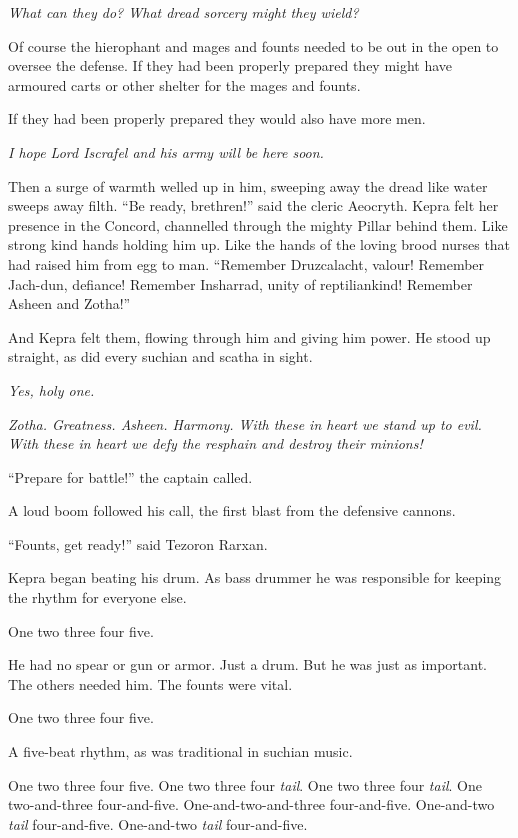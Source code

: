 \documentclass
  [a4paper,
   12pt,
   oneside
  ]%
  {article}
\newcommand{\drum}[1]{\textsf{#1}}
\begin{document}
\emph{What can they do? What dread sorcery might they wield?} 

Of course the hierophant and mages and founts needed to be out in the open to oversee the defense. 
If they had been properly prepared they might have armoured carts or other shelter for the mages and founts. 

If they had been properly prepared they would also have more men.

\emph{I hope Lord Iscrafel and his army will be here soon.}

Then a surge of warmth welled up in him, sweeping away the dread like water sweeps away filth. 
``Be ready, brethren!'' said the cleric Aeocryth. 
Kepra felt her presence in the Concord, channelled through the mighty Pillar behind them. 
Like strong kind hands holding him up. 
Like the hands of the loving brood nurses that had raised him from egg to man.
``Remember Druzcalacht, valour! Remember Jach-dun, defiance! Remember Insharrad, unity of reptiliankind! Remember Asheen and Zotha!'' 

And Kepra felt them, flowing through him and giving him power. He stood up straight, as did every suchian and scatha in sight. 

\emph{Yes, holy one.}

\emph{Zotha. Greatness. Asheen. Harmony. With these in heart we stand up to evil. With these in heart we defy the resphain and destroy their minions!}

``Prepare for battle!'' the captain called.

A loud boom followed his call, the first blast from the defensive cannons. 

``Founts, get ready!'' said Tezoron Rarxan. 

Kepra began beating his drum. As bass drummer he was responsible for keeping the rhythm for everyone else.

\drum{One two three four five.} 

He had no spear or gun or armor. Just a drum. 
But he was just as important.
The others needed him. 
The founts were vital. 

\drum{One two three four five.}

A five-beat rhythm, as was traditional in suchian music. 

\drum{%
    One two three four five. One two three four \emph{tail}. One two three four \emph{tail}. One two-and-three four-and-five. One-and-two-and-three four-and-five. One-and-two \emph{tail} four-and-five. One-and-two \emph{tail} four-and-five.}
\end{document}
